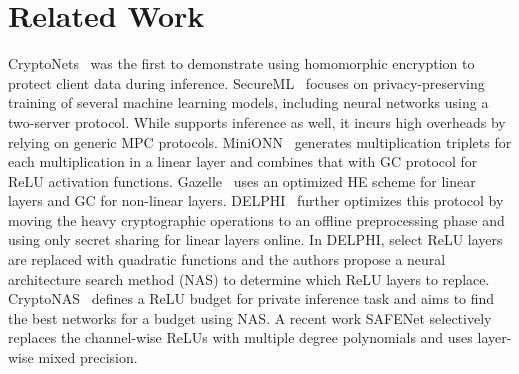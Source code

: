 \section{Related Work}
\label{sec:relatedwork}

CryptoNets~\cite{gilad2016cryptonets} was the first to demonstrate using homomorphic encryption to protect client data during inference. 
SecureML~\cite{mohassel2017secureml} focuses on privacy-preserving training of several machine learning models, including neural networks using a two-server protocol. 
While \cite{mohassel2017secureml} supports inference as well, it incurs high overheads by relying on generic MPC protocols. MiniONN~\cite{liu2017oblivious} generates multiplication triplets for each multiplication in a linear layer and combines that with GC protocol for ReLU activation functions. 
Gazelle~\cite{juvekar2018gazelle} uses an optimized HE scheme for linear layers and GC for non-linear layers. DELPHI~\cite{mishra2020delphi} further optimizes this protocol by moving the heavy cryptographic operations to an offline preprocessing phase and using only secret sharing for linear layers online. 
In DELPHI, select ReLU layers are replaced with quadratic functions and the authors propose a neural architecture search method (NAS) to determine which ReLU layers to replace. 
CryptoNAS~\cite{ghodsi2020cryptonas} defines a ReLU budget for private inference task and aims to find the best networks for a budget using NAS. A recent work SAFENet \cite{lou2021safenet} selectively replaces the channel-wise ReLUs with multiple degree polynomials and uses layer-wise mixed precision. 



 
